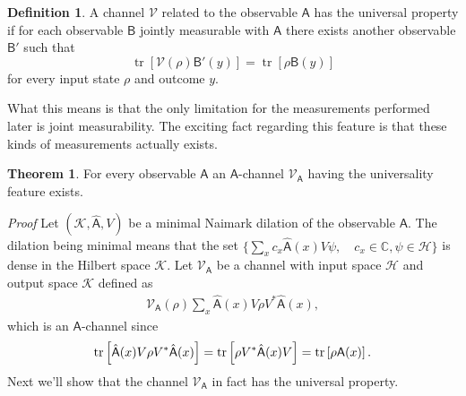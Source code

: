 \documentclass[a4paper,12pt]{wihuri}
\theoremstyle{definition}
\newtheorem{definition}{Definition}
\newtheorem{theorem}{Theorem}
\numberwithin{definition}{section}
\numberwithin{example}{section}
\numberwithin{theorem}{section}
\numberwithin{proposition}{section}
\numberwithin{lemma}{section}
\newcommand{\hi}{\mathcal{H}}%
\newcommand{\ki}{\mathcal{K}}%
\newcommand{\V}{\mathcal{V}}%
\newcommand{\A}{\mathsf{A}}%
\newcommand{\B}{\mathsf{B}}%
\DeclareMathOperator{\tr}{tr}
\begin{document}
\begin{definition}
A channel $\V$ related to the observable $\A$ has the universal property if for each observable $\B$ jointly measurable with $\A$ there exists another observable $\B'$ such that
\begin{equation}\label{universality_joint}
\tr[\V(\rho)\B'(y)] = \tr[\rho\B(y)]
\end{equation}
for every input state $\rho$ and outcome $y$.
\end{definition}
What this means is that the only limitation for the measurements performed later is joint measurability. The exciting fact regarding this feature is that these kinds of measurements actually exists\cite{heinosaari_miyadera_universality}.
\begin{theorem}
For every observable $\A$ an $\A$-channel $\V_{\A}$ having the universality feature exists.
\end{theorem}


\noindent \textit{Proof} Let $(\ki, \hat{\A}, V)$ be a minimal Naimark dilation of the observable $\A$. The dilation being minimal means that the set $\lbrace \sum_x c_x\hat{\A}(x)V\psi, \quad c_x\in \mathbb{C}, \psi \in \hi \rbrace$ is dense in the Hilbert space $\ki$. Let $\V_{\A}$ be a channel with input space $\hi$ and output space $\ki$ defined as 
\begin{align*}
\V_{\A}(\rho) \sum_x\hat{\A}(x)V\rho V^*\hat{\A}(x),
\end{align*}
which is an $\A$-channel since
\begin{align*}
\tr\left[\hat{\A}(x)V\rho V^*\hat{\A}(x)\right] = \tr\left[\rho V^* \hat{\A}(x)V \right] = \tr\left[\rho\A(x) \right]\text.
\end{align*}
Next we'll show that the channel $\V_{\A}$ in fact has the universal property.
\end{document}
